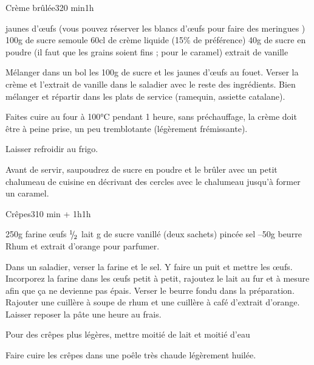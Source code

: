 \begin{recette}{Crème brûlée}{3}{20 min}{1h}
\begin{ingredients}[5 pers.]
 jaunes d'œufs (vous pouvez réserver les blancs d'œufs pour faire des meringues )
\ingredient 100g de sucre semoule
\ingredient 60cl de crème liquide (15\% de préférence)
\ingredient 40g de sucre en poudre (il faut que les grains soient fins ; pour le caramel)
\ingredient extrait de vanille
\end{ingredients}

\begin{preparation}
\etape Mélanger dans un bol les 100g de sucre et les jaunes d'œufs au fouet.
\etape Verser la crème et l'extrait de vanille dans le saladier avec le reste des ingrédients.
\etape Bien mélanger et répartir dans les plats de service (ramequin, assiette catalane).
\end{preparation}

\begin{cuisson}
Faites cuire au four à 100°C pendant 1 heure, sans préchauffage, la crème doit être à peine prise, un peu tremblotante (légèrement frémissante). 

Laisser refroidir au frigo. 

Avant de servir, saupoudrez de sucre en poudre et le brûler avec un petit chalumeau de cuisine en décrivant des cercles avec le chalumeau jusqu'à former un caramel. 

\end{cuisson}


\end{recette}

\begin{recette}{Crêpes}{3}{10 min + 1h}{1h}
\begin{ingredients}
\ingredient 250g farine
 œufs
\ingredient ${{}^{1\!\!}/ _{\!2}}$ lait
 g de sucre vanillé (deux sachets)
 pincée sel
--50g beurre
\ingredient Rhum et extrait d'orange pour parfumer.
\end{ingredients}


\begin{preparation}
\etape Dans un saladier, verser la farine et le sel.
\etape Y faire un puit et mettre les œufs. Incorporez la farine dans les œufs petit à petit, rajoutez le lait au fur et à mesure afin que ça ne devienne pas épais.
\etape Verser le beurre fondu dans la préparation.
\etape Rajouter une cuillère à soupe de rhum et une cuillère à café d'extrait d'orange.
\etape Laisser reposer la pâte une heure au frais.
\end{preparation}

\begin{remarque}
Pour des crêpes plus légères, mettre moitié de lait et moitié d'eau
\end{remarque}

\begin{cuisson}
Faire cuire les crêpes dans une poêle très chaude légèrement huilée.
\end{cuisson}
\end{recette}

